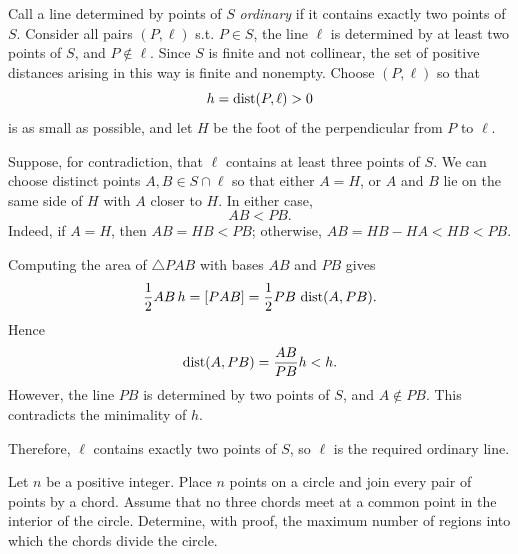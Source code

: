     \begin{solution}
        Call a line determined by points of $S$ \emph{ordinary} if it contains
        exactly two points of $S$. Consider all pairs $(P,\ell)$ s.t.
        $P\in S$, the line $\ell$ is determined by at least two points of $S$,
        and $P\notin\ell$. Since $S$ is finite and not collinear, the set of
        positive distances arising in this way is finite and nonempty. Choose
        $(P,\ell)$ so that
        \[
            h=\operatorname{dist}(P,\ell)>0
        \]
        is as small as possible, and let $H$ be the foot of the perpendicular
        from $P$ to $\ell$.

        Suppose, for contradiction, that $\ell$ contains at least three points
        of $S$. We can choose distinct points $A,B\in S\cap\ell$ so that either
        $A=H$, or $A$ and $B$ lie on the same side of $H$ with $A$ closer to
        $H$. In either case,
        \[
            AB<PB.
        \]
        Indeed, if $A=H$, then $AB=HB<PB$; otherwise,
        $AB=HB-HA<HB<PB$.

        Computing the area of $\triangle PAB$ with bases $AB$ and $PB$ gives
        \[
            \frac12 AB\,h
            =
            [PAB]
            =
            \frac12 PB\,\operatorname{dist}(A,PB).
        \]
        Hence
        \[
            \operatorname{dist}(A,PB)
            =
            \frac{AB}{PB}h
            <
            h.
        \]
        However, the line $PB$ is determined by two points of $S$, and
        $A\notin PB$. This contradicts the minimality of $h$.

        Therefore, $\ell$ contains exactly two points of $S$, so $\ell$ is the
        required ordinary line.
    \end{solution}

    \begin{expectedproblem}
        Let $n$ be a positive integer. Place $n$ points on a circle and join
        every pair of points by a chord.
        Assume that no three chords meet at a common point in the interior of
        the circle. Determine, with proof, the maximum number of regions into
        which the chords divide the circle.
    \end{expectedproblem}

